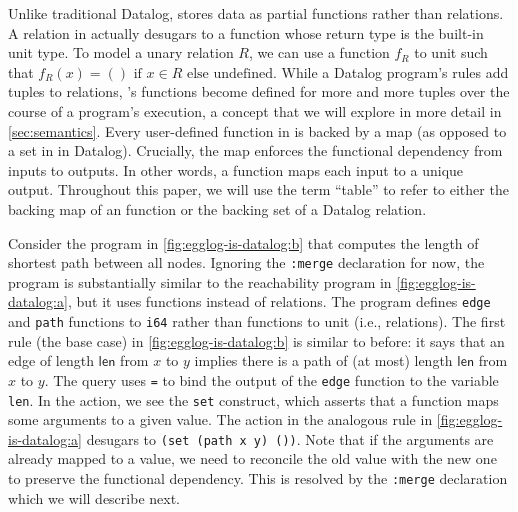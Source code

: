 Unlike traditional Datalog, 
 \egglog stores data as partial functions rather than relations.
A relation in \egglog actually 
 desugars to a function whose return type is the built-in unit type.
To model a unary relation $R$,
 we can use a function $f_R$ to unit such that
 $f_R(x) = () \text{ if } x \in R \text{ else undefined}$.
While a Datalog program's rules add tuples to relations,
 \egglog's functions become defined for more and more tuples
 over the course of a program's execution,
 a concept that we will explore in more detail in \autoref{sec:semantics}.
Every user-defined function in \egglog is
 backed by a map (as opposed to a set in in Datalog).
Crucially, the map enforces the functional dependency from inputs to outputs.
In other words, a function maps each input to a unique output.
Throughout this paper, 
 we will use the term ``table'' to refer to either
 the backing map of an \egglog function
 or the backing set of a Datalog relation.

Consider the program in \autoref{fig:egglog-is-datalog:b}
 that computes the length of shortest path between all nodes.
Ignoring the \lstinline{:merge} declaration for now,
 the program is substantially similar 
 to the reachability program in \autoref{fig:egglog-is-datalog:a},
 but it uses functions instead of relations.
The program defines 
 \lstinline{edge} and \lstinline{path} functions to \lstinline{i64}
 rather than functions to unit (i.e., relations).
The first rule (the base case) in \autoref{fig:egglog-is-datalog:b}
 is similar to before: 
 it says that an edge of length $\mathsf{len}$ from $x$ to $y$
 implies there is a path of (at most) length $\mathsf{len}$ from $x$ to $y$.
The query uses
 \lstinline{=} to bind the output
 of the \lstinline{edge} function to the variable \lstinline{len}.
In the action, 
 we see the \lstinline{set} construct,
 which asserts
 that a function maps some arguments to a given value.
The action in the 
 analogous rule in \autoref{fig:egglog-is-datalog:a}
 desugars to \lstinline{(set (path x y) ())}.
Note that if the arguments are already mapped to a value, 
 we need to reconcile the old value with the new one
 to preserve the functional dependency.
This is resolved by the \lstinline{:merge} declaration which 
 we will describe next.


